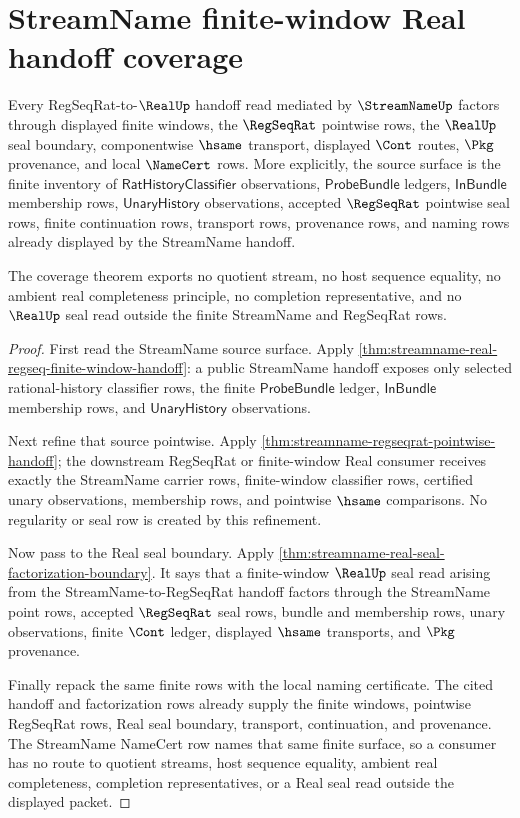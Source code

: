 \section{StreamName finite-window Real handoff coverage}
\label{sec:streamname-finite-window-real-handoff-coverage}

\begin{theorem}
\label{thm:streamname-finite-window-real-handoff-coverage}
Every RegSeqRat-to-$\RealUp$ handoff read mediated by $\StreamNameUp$ factors through displayed finite windows, the $\RegSeqRat$ pointwise rows, the $\RealUp$ seal boundary, componentwise $\hsame$ transport, displayed $\Cont$ routes, $\Pkg$ provenance, and local $\NameCert$ rows. More explicitly, the source surface is the finite inventory of $\mathsf{RatHistoryClassifier}$ observations, $\mathsf{ProbeBundle}$ ledgers, $\mathsf{InBundle}$ membership rows, $\mathsf{UnaryHistory}$ observations, accepted $\RegSeqRat$ pointwise seal rows, finite continuation rows, transport rows, provenance rows, and naming rows already displayed by the StreamName handoff.

The coverage theorem exports no quotient stream, no host sequence equality, no ambient real completeness principle, no completion representative, and no $\RealUp$ seal read outside the finite StreamName and RegSeqRat rows.
\end{theorem}
\begin{proof}
First read the StreamName source surface. Apply \autoref{thm:streamname-real-regseq-finite-window-handoff}: a public StreamName handoff exposes only selected rational-history classifier rows, the finite $\mathsf{ProbeBundle}$ ledger, $\mathsf{InBundle}$ membership rows, and $\mathsf{UnaryHistory}$ observations.

Next refine that source pointwise. Apply \autoref{thm:streamname-regseqrat-pointwise-handoff}; the downstream RegSeqRat or finite-window Real consumer receives exactly the StreamName carrier rows, finite-window classifier rows, certified unary observations, membership rows, and pointwise $\hsame$ comparisons. No regularity or seal row is created by this refinement.

Now pass to the Real seal boundary. Apply \autoref{thm:streamname-real-seal-factorization-boundary}. It says that a finite-window $\RealUp$ seal read arising from the StreamName-to-RegSeqRat handoff factors through the StreamName point rows, accepted $\RegSeqRat$ seal rows, bundle and membership rows, unary observations, finite $\Cont$ ledger, displayed $\hsame$ transports, and $\Pkg$ provenance.

Finally repack the same finite rows with the local naming certificate. The cited handoff and factorization rows already supply the finite windows, pointwise RegSeqRat rows, Real seal boundary, transport, continuation, and provenance. The StreamName NameCert row names that same finite surface, so a consumer has no route to quotient streams, host sequence equality, ambient real completeness, completion representatives, or a Real seal read outside the displayed packet.
\end{proof}


